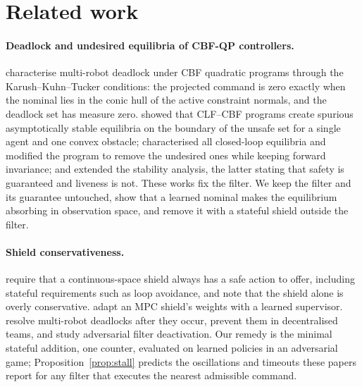 \documentclass{l4dc2027}
\begin{document}
\section{Related work}\label{sec:related}

\paragraph{Deadlock and undesired equilibria of CBF-QP controllers.} \citet{grover2020symmetry,grover2021deadlock,grover2023before} characterise multi-robot deadlock under CBF quadratic programs through the Karush--Kuhn--Tucker conditions: the projected command is zero exactly when the nominal lies in the conic hull of the active constraint normals, and the deadlock set has measure zero. \citet{reis2021cbfqp} showed that CLF--CBF programs create spurious asymptotically stable equilibria on the boundary of the unsafe set for a single agent and one convex obstacle; \citet{tan2024undesired} characterised all closed-loop equilibria and modified the program to remove the undesired ones while keeping forward invariance; \citet{reis2026stability} and \citet{reis2025unified} extended the stability analysis, the latter stating that safety is guaranteed and liveness is not. These works fix the filter. We keep the filter and its guarantee untouched, show that a learned nominal makes the equilibrium absorbing in observation space, and remove it with a stateful shield outside the filter.

\paragraph{Shield conservativeness.} \citet{kim2025realizable} require that a continuous-space shield always has a safe action to offer, including stateful requirements such as loop avoidance, and note that the shield alone is overly conservative. \citet{dawood2025dynamic} adapt an MPC shield's weights with a learned supervisor. \citet{wang2025neurosymbolic} resolve multi-robot deadlocks after they occur, \citet{lee2025merrygoround} prevent them in decentralised teams, and \citet{arnstrom2025stealthy} study adversarial filter deactivation. Our remedy is the minimal stateful addition, one counter, evaluated on learned policies in an adversarial game; Proposition~\ref{prop:stall} predicts the oscillations and timeouts these papers report for any filter that executes the nearest admissible command.
\end{document}
